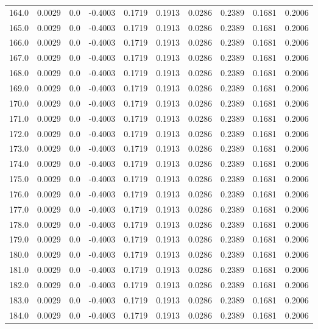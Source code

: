 \begin{longtable}{lrrrrrrrrr}
164.0 & 0.0029 & 0.0 & -0.4003 & 0.1719 & 0.1913 & 0.0286 & 0.2389 & 0.1681 & 0.2006 \\
165.0 & 0.0029 & 0.0 & -0.4003 & 0.1719 & 0.1913 & 0.0286 & 0.2389 & 0.1681 & 0.2006 \\
166.0 & 0.0029 & 0.0 & -0.4003 & 0.1719 & 0.1913 & 0.0286 & 0.2389 & 0.1681 & 0.2006 \\
167.0 & 0.0029 & 0.0 & -0.4003 & 0.1719 & 0.1913 & 0.0286 & 0.2389 & 0.1681 & 0.2006 \\
168.0 & 0.0029 & 0.0 & -0.4003 & 0.1719 & 0.1913 & 0.0286 & 0.2389 & 0.1681 & 0.2006 \\
169.0 & 0.0029 & 0.0 & -0.4003 & 0.1719 & 0.1913 & 0.0286 & 0.2389 & 0.1681 & 0.2006 \\
170.0 & 0.0029 & 0.0 & -0.4003 & 0.1719 & 0.1913 & 0.0286 & 0.2389 & 0.1681 & 0.2006 \\
171.0 & 0.0029 & 0.0 & -0.4003 & 0.1719 & 0.1913 & 0.0286 & 0.2389 & 0.1681 & 0.2006 \\
172.0 & 0.0029 & 0.0 & -0.4003 & 0.1719 & 0.1913 & 0.0286 & 0.2389 & 0.1681 & 0.2006 \\
173.0 & 0.0029 & 0.0 & -0.4003 & 0.1719 & 0.1913 & 0.0286 & 0.2389 & 0.1681 & 0.2006 \\
174.0 & 0.0029 & 0.0 & -0.4003 & 0.1719 & 0.1913 & 0.0286 & 0.2389 & 0.1681 & 0.2006 \\
175.0 & 0.0029 & 0.0 & -0.4003 & 0.1719 & 0.1913 & 0.0286 & 0.2389 & 0.1681 & 0.2006 \\
176.0 & 0.0029 & 0.0 & -0.4003 & 0.1719 & 0.1913 & 0.0286 & 0.2389 & 0.1681 & 0.2006 \\
177.0 & 0.0029 & 0.0 & -0.4003 & 0.1719 & 0.1913 & 0.0286 & 0.2389 & 0.1681 & 0.2006 \\
178.0 & 0.0029 & 0.0 & -0.4003 & 0.1719 & 0.1913 & 0.0286 & 0.2389 & 0.1681 & 0.2006 \\
179.0 & 0.0029 & 0.0 & -0.4003 & 0.1719 & 0.1913 & 0.0286 & 0.2389 & 0.1681 & 0.2006 \\
180.0 & 0.0029 & 0.0 & -0.4003 & 0.1719 & 0.1913 & 0.0286 & 0.2389 & 0.1681 & 0.2006 \\
181.0 & 0.0029 & 0.0 & -0.4003 & 0.1719 & 0.1913 & 0.0286 & 0.2389 & 0.1681 & 0.2006 \\
182.0 & 0.0029 & 0.0 & -0.4003 & 0.1719 & 0.1913 & 0.0286 & 0.2389 & 0.1681 & 0.2006 \\
183.0 & 0.0029 & 0.0 & -0.4003 & 0.1719 & 0.1913 & 0.0286 & 0.2389 & 0.1681 & 0.2006 \\
184.0 & 0.0029 & 0.0 & -0.4003 & 0.1719 & 0.1913 & 0.0286 & 0.2389 & 0.1681 & 0.2006 \\

\end{longtable}
